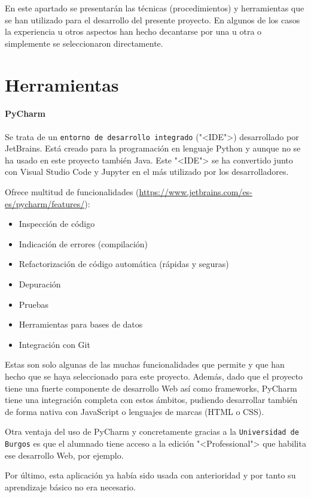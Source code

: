 
En este apartado se presentarán las técnicas (procedimientos) y herramientas que
se han utilizado para el desarrollo del presente proyecto. En algunos de los
casos la experiencia u otros aspectos han hecho decantarse por una u otra o
simplemente se seleccionaron directamente.


\section{Herramientas}

\paragraph{PyCharm}
Se trata de un \texttt{entorno de desarrollo integrado} ("<IDE">) desarrollado por
JetBrains. Está creado para la programación en lenguaje Python y aunque no se ha
usado en este proyecto también Java. Este "<IDE"> se ha convertido junto con Visual
Studio Code y Jupyter en el más utilizado por los desarrolladores.

Ofrece multitud de funcionalidades (\url{https://www.jetbrains.com/es-es/pycharm/features/}):
\begin{itemize}
	\item Inspección de código
	\item Indicación de errores (compilación)
	\item Refactorización de código automática (rápidas y seguras)
	\item Depuración
	\item Pruebas
	\item Herramientas para bases de datos
	\item Integración con Git
\end{itemize}

Estas son solo algunas de las muchas funcionalidades que permite y que han hecho
que se haya seleccionado para este proyecto. Además, dado que el proyecto tiene
una fuerte componente de desarrollo Web así como frameworks, PyCharm tiene una
integración completa con estos ámbitos, pudiendo desarrollar también de forma
nativa con JavaScript o lenguajes de marcas (HTML o CSS).

Otra ventaja del uso de PyCharm y concretamente gracias a la \texttt{Universidad
de Burgos} es que el alumnado tiene acceso a la edición "<Professional"> que
habilita ese desarrollo Web, por ejemplo.

Por último, esta aplicación ya había sido usada con anterioridad y por tanto su
aprendizaje básico no era necesario.

